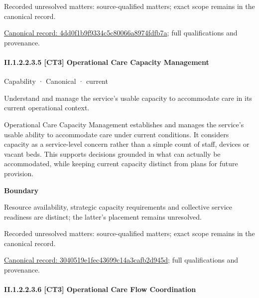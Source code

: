{\small Recorded unresolved matters: source-qualified matters; exact scope remains in the canonical record.}\par
{\footnotesize \href{../../../../continuum/strategy/capability/4dd0f1b9f9334c5c80066a8974fdfb7a.md}{Canonical record: 4dd0f1b9f9334c5c80066a8974fdfb7a}; full qualifications and provenance.}\par
\paragraph*{II.1.2.2.3.5 [CT3] Operational Care Capacity Management}
\label{navigation:II.1.2.2.3.5}

\label{element:3040519e1fec43699c14a3cafb2d945d}
{\small Capability · Canonical · current}\par

Understand and manage the service’s usable capacity to accommodate care in its current operational context.



Operational Care Capacity Management establishes and manages the service's usable ability to accommodate care under current conditions. It considers capacity as a service-level concern rather than a simple count of staff, devices or vacant beds. This supports decisions grounded in what can actually be accommodated, while keeping current capacity distinct from plans for future provision.



\textbf{Boundary}



Resource availability, strategic capacity requirements and collective service readiness are distinct; the latter's placement remains unresolved.


{\small Recorded unresolved matters: source-qualified matters; exact scope remains in the canonical record.}\par
{\footnotesize \href{../../../../continuum/strategy/capability/3040519e1fec43699c14a3cafb2d945d.md}{Canonical record: 3040519e1fec43699c14a3cafb2d945d}; full qualifications and provenance.}\par
\paragraph*{II.1.2.2.3.6 [CT3] Operational Care Flow Coordination}
\label{navigation:II.1.2.2.3.6}

